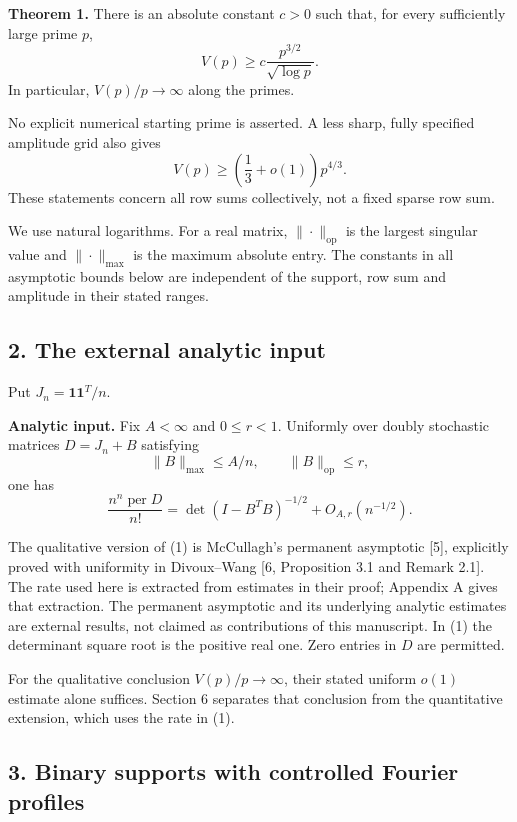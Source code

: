 \documentclass[
  11pt,
]{article}
\begin{document}
\textbf{Theorem 1.} There is an absolute constant \(c>0\) such that, for
every sufficiently large prime \(p\), \[
 V(p)\ge c\frac{p^{3/2}}{\sqrt{\log p}}.
\] In particular, \(V(p)/p\to\infty\) along the primes.

No explicit numerical starting prime is asserted. A less sharp, fully
specified amplitude grid also gives \[
 V(p)\ge \left(\frac13+o(1)\right)p^{4/3}.
\] These statements concern all row sums collectively, not a fixed
sparse row sum.

We use natural logarithms. For a real matrix,
\(\|\cdot\|_{\mathrm{op}}\) is the largest singular value and
\(\|\cdot\|_{\max}\) is the maximum absolute entry. The constants in all
asymptotic bounds below are independent of the support, row sum and
amplitude in their stated ranges.

\subsection{2. The external analytic
input}\label{the-external-analytic-input}

Put \(J_n=\mathbf1\mathbf1^T/n\).

\textbf{Analytic input.} Fix \(A<\infty\) and \(0\le r<1\). Uniformly
over doubly stochastic matrices \(D=J_n+B\) satisfying \[
 \|B\|_{\max}\le A/n,\qquad \|B\|_{\mathrm{op}}\le r,
\] one has \[
 \frac{n^n\operatorname{per}D}{n!}
 =\det(I-B^TB)^{-1/2}+O_{A,r}(n^{-1/2}).                 \tag{1}
\]

The qualitative version of (1) is McCullagh's permanent asymptotic
{[}5{]}, explicitly proved with uniformity in Divoux--Wang {[}6,
Proposition 3.1 and Remark 2.1{]}. The rate used here is extracted from
estimates in their proof; Appendix A gives that extraction. The
permanent asymptotic and its underlying analytic estimates are external
results, not claimed as contributions of this manuscript. In (1) the
determinant square root is the positive real one. Zero entries in \(D\)
are permitted.

For the qualitative conclusion \(V(p)/p\to\infty\), their stated uniform
\(o(1)\) estimate alone suffices. Section 6 separates that conclusion
from the quantitative extension, which uses the rate in (1).

\subsection{3. Binary supports with controlled Fourier
profiles}\label{binary-supports-with-controlled-fourier-profiles}
\end{document}
